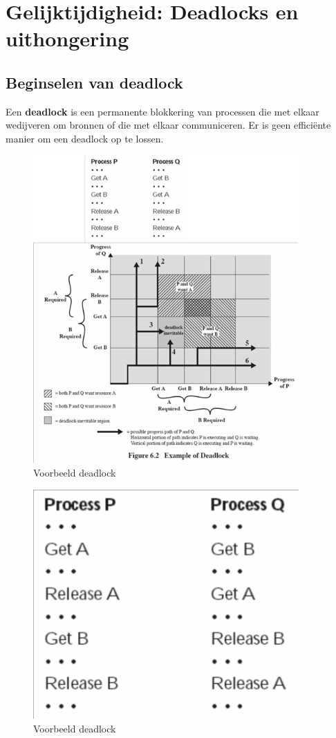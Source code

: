 \section{Gelijktijdigheid: Deadlocks en uithongering}

\subsection{Beginselen van deadlock}

Een \textbf{deadlock} is een permanente blokkering van processen die met elkaar wedijveren om bronnen of die met elkaar communiceren. Er is geen efficiënte manier om een deadlock op te lossen.

\begin{figure}[htp]
    \centering
            \includegraphics[width=4in]{img/deadlock.png}
        \caption{Voorbeeld deadlock}
    \label{fig:Voorbeeld deadlock}
\end{figure}

\begin{figure}[htp]
    \centering
            \includegraphics[width=4in]{img/processen.png}
        \caption{Voorbeeld deadlock}
    \label{fig:Voorbeeld deadlock}
\end{figure}


